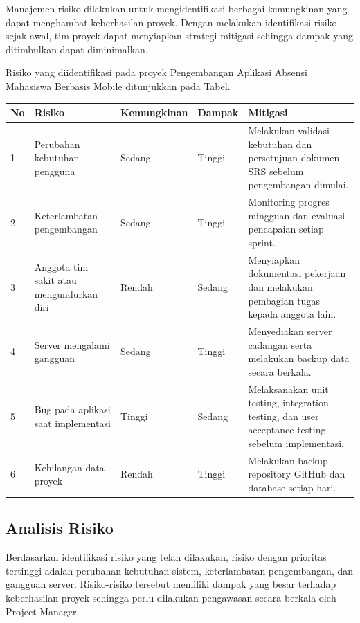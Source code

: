 \documentclass[12pt,a4paper]{article}
\begin{document}
Manajemen risiko dilakukan untuk mengidentifikasi berbagai kemungkinan yang dapat menghambat keberhasilan proyek. Dengan melakukan identifikasi risiko sejak awal, tim proyek dapat menyiapkan strategi mitigasi sehingga dampak yang ditimbulkan dapat diminimalkan.

Risiko yang diidentifikasi pada proyek Pengembangan Aplikasi Absensi Mahasiswa Berbasis Mobile ditunjukkan pada Tabel.

\begin{table}[H]
\centering
\begin{tabular}{p{0.8cm} p{4cm} p{2.3cm} p{2cm} p{5cm}}
\toprule
\textbf{No} & \textbf{Risiko} & \textbf{Kemungkinan} & \textbf{Dampak} & \textbf{Mitigasi} \\
\midrule
1 & Perubahan kebutuhan pengguna & Sedang & Tinggi & Melakukan validasi kebutuhan dan persetujuan dokumen SRS sebelum pengembangan dimulai. \\

2 & Keterlambatan pengembangan & Sedang & Tinggi & Monitoring progres mingguan dan evaluasi pencapaian setiap sprint. \\

3 & Anggota tim sakit atau mengundurkan diri & Rendah & Sedang & Menyiapkan dokumentasi pekerjaan dan melakukan pembagian tugas kepada anggota lain. \\

4 & Server mengalami gangguan & Sedang & Tinggi & Menyediakan server cadangan serta melakukan backup data secara berkala. \\

5 & Bug pada aplikasi saat implementasi & Tinggi & Sedang & Melaksanakan unit testing, integration testing, dan user acceptance testing sebelum implementasi. \\

6 & Kehilangan data proyek & Rendah & Tinggi & Melakukan backup repository GitHub dan database setiap hari. \\
\bottomrule
\end{tabular}
\end{table}

\subsection{Analisis Risiko}

Berdasarkan identifikasi risiko yang telah dilakukan, risiko dengan prioritas tertinggi adalah perubahan kebutuhan sistem, keterlambatan pengembangan, dan gangguan server. Risiko-risiko tersebut memiliki dampak yang besar terhadap keberhasilan proyek sehingga perlu dilakukan pengawasan secara berkala oleh Project Manager.
\end{document}
